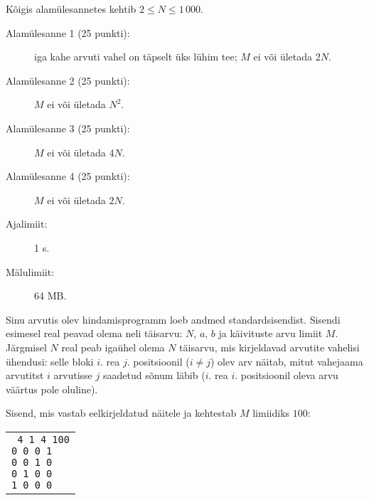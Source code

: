 \documentclass{boi2014-et}
\begin{document}
    \Scoring

    Kõigis alamülesannetes kehtib $2 \le N \le 1\,000$.

    \begin{description}
        \item[Alamülesanne 1 (25 punkti):] iga kahe arvuti vahel
            on täpselt üks lühim tee; $M$ ei või ületada $2N$.
        \item[Alamülesanne 2 (25 punkti):] $M$ ei või ületada $N^2$.
        \item[Alamülesanne 3 (25 punkti):] $M$ ei või ületada $4N$.
        \item[Alamülesanne 4 (25 punkti):] $M$ ei või ületada $2N$.
    \end{description}

    \Constraints

    \begin{description}
        \item[Ajalimiit:] 1 s.
        \item[Mälulimiit:] 64 MB.
    \end{description}

    \Experimentation

    Sinu arvutis olev hindamisprogramm loeb andmed standardsisendist.
    Sisendi esimesel real peavad olema neli täisarvu: $N$, $a$, $b$ ja
     käivituste arvu limiit $M$. Järgmisel $N$ real peab
    igaühel olema $N$ täisarvu, mis kirjeldavad arvutite vahelisi ühendusi:
    selle bloki $i$. rea $j$. positsioonil ($i \neq j$) olev arv näitab,
    mitut vahejaama arvutitst $i$ arvutisse $j$ saadetud sõnum läbib
    ($i$. rea $i$. positsioonil oleva arvu väärtus pole oluline).

    Sisend, mis vastab eelkirjeldatud näitele ja kehtestab $M$ limiidiks
    $100$:
    \begin{center}
        \begin{tabular}{p{4cm}}
            {\tt
                4 1 4 100 \newline
                0 0 0 1 \newline
                0 0 1 0 \newline
                0 1 0 0 \newline
                1 0 0 0
            }
        \end{tabular}
    \end{center}
\end{document}
